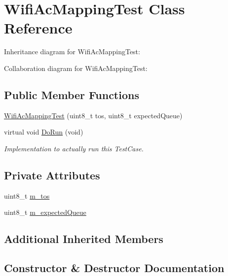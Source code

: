 \hypertarget{classWifiAcMappingTest}{}\section{Wifi\+Ac\+Mapping\+Test Class Reference}
\label{classWifiAcMappingTest}


Inheritance diagram for Wifi\+Ac\+Mapping\+Test\+:


Collaboration diagram for Wifi\+Ac\+Mapping\+Test\+:
\subsection*{Public Member Functions}
\begin{DoxyCompactItemize}
\item 
\hyperlink{classWifiAcMappingTest_a82f6248f01d164ec9a62633ba49f6e77}{Wifi\+Ac\+Mapping\+Test} (uint8\+\_\+t tos, uint8\+\_\+t expected\+Queue)
\item 
virtual void \hyperlink{classWifiAcMappingTest_ae0d828d29768d59590210d2f1bf8a552}{Do\+Run} (void)
\begin{DoxyCompactList}\small\item\em Implementation to actually run this Test\+Case. \end{DoxyCompactList}\end{DoxyCompactItemize}
\subsection*{Private Attributes}
\begin{DoxyCompactItemize}
\item 
uint8\+\_\+t \hyperlink{classWifiAcMappingTest_a9e987a3d809f54cf531580fbad93e08c}{m\+\_\+tos}
\item 
uint8\+\_\+t \hyperlink{classWifiAcMappingTest_a8f3ed274153f2ff1568b9fedb07a1185}{m\+\_\+expected\+Queue}
\end{DoxyCompactItemize}
\subsection*{Additional Inherited Members}


\subsection{Constructor \& Destructor Documentation}
